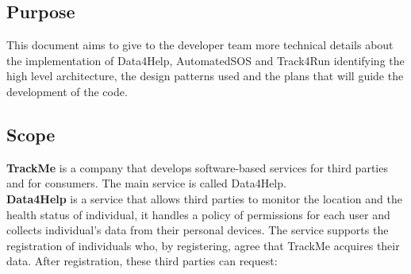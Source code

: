 \documentclass[a4paper]{article}
\begin{document}
\subsection{Purpose}
This document aims to give to the developer team more technical details about the implementation of Data4Help, AutomatedSOS and Track4Run identifying the high level architecture, the design patterns used and the plans that will guide the development of the code.
\vspace{.5 cm}

\subsection{Scope}
\textbf{TrackMe} is a company that develops software-based services for third parties and for consumers. The main service is called Data4Help. \\
\textbf{Data4Help} is a service that allows third parties to monitor the location and the health status of individual, it handles a policy of permissions for each user and collects individual’s data from their personal devices.
The service supports the registration of individuals who, by registering, agree that TrackMe acquires their data. After registration, these third parties can request:
\end{document}
